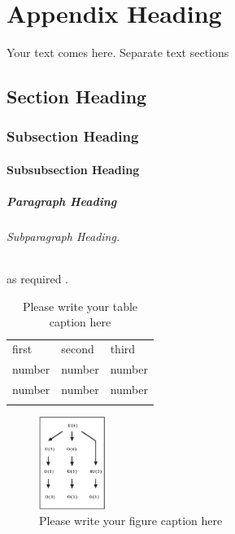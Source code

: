 %
%

\chapter{Appendix Heading}
\label{A:app} %

Your text comes here. Separate text sections

\section{Section Heading}
\label{A:sec:1}  %

\subsection{Subsection Heading}
\label{A:sec:2}

\subsubsection{Subsubsection Heading}

\paragraph{Paragraph Heading}
\subparagraph{Subparagraph Heading.} as required%
. %

%
\begin{table}
\centering
\caption{Please write your table caption here}
\label{A:tab:1}       %
\begin{tabular}{lll}
\hline\noalign{\smallskip}
first & second & third  \\
\noalign{\smallskip}\hline\noalign{\smallskip}
number & number & number \\
number & number & number \\
\noalign{\smallskip}\hline
\end{tabular}
\end{table}
%
%
%
\begin{figure}
\centering
\includegraphics[height=3cm]{figure.eps}
\caption{Please write your figure caption here}
\label{A:fig:1}       %
\end{figure}


